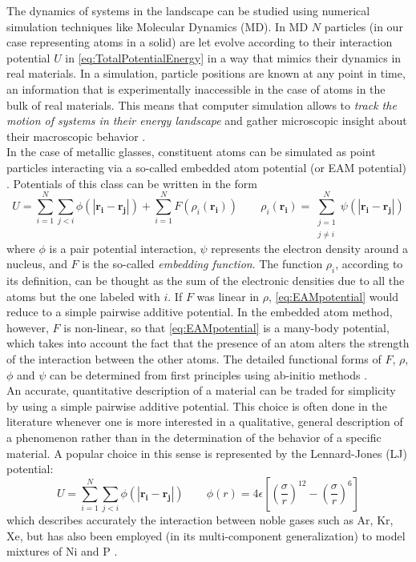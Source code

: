 The dynamics of systems in the landscape can be studied using numerical simulation techniques like Molecular Dynamics (MD). In MD $N$ particles (in our case representing atoms in a solid) are let evolve according to their interaction potential $U$ in \autoref{eq:TotalPotentialEnergy} in a way that mimics their dynamics in real materials. In a simulation, particle positions are known at any point in time, an information that is experimentally inaccessible in the case of atoms in the bulk of real materials. This means that computer simulation allows to \emph{track the motion of systems in their energy landscape} and gather microscopic insight about their macroscopic behavior \cite{heuer2008exploring}.\\
In the case of metallic glasses, constituent atoms can be simulated as point particles interacting via a so-called embedded atom potential (or EAM potential) \cite{daw1993embedded}. Potentials of this class can be written in the form
\begin{equation}
U = \sum_{i=1}^{N} \sum_{j<i} \phi(|\mathbf{r_{i} - r_{j}}|) + \sum_{i = 1}^{N} F(\rho_{i}(\mathbf{r_{i}})) \qquad \rho_{i}(\mathbf{r_{i}}) = \sum_{\substack{j = 1\\ j \neq i}}^{N} \psi (|\mathbf{r_{i} - r_{j}}|)
\label{eq:EAMpotential}
\end{equation}
where $\phi$ is a pair potential interaction, $\psi$ represents the electron density around a nucleus, and $F$ is the so-called \emph{embedding function}. The function $\rho_{i}$, according to its definition, can be thought as the sum of the electronic densities due to all the atoms but the one labeled with $i$. If $F$ was linear in $\rho$, \autoref{eq:EAMpotential} would reduce to a simple pairwise additive potential. In the embedded atom method, however, $F$ is non-linear, so that \autoref{eq:EAMpotential} is a many-body potential, which takes into account the fact that the presence of an atom alters the strength of the interaction between the other atoms. The detailed functional forms of $F$, $\rho$, $\phi$ and $\psi$ can be determined from first principles using ab-initio methods \cite{daw1993embedded}.\\
An accurate, quantitative description of a material can be traded for simplicity by using a simple pairwise additive potential. This choice is often done in the literature whenever one is more interested in a qualitative, general description of a phenomenon rather than in the determination of the behavior of a specific material. A popular choice in this sense is represented by the Lennard-Jones (LJ) potential:
\begin{equation}
U = \sum_{i=1}^{N} \sum_{j<i} \phi(|\mathbf{r_{i} - r_{j}}|) \qquad \phi(r) = 4\epsilon \left[\left(\frac{\sigma}{r}\right)^{12} - \left(\frac{\sigma}{r}\right)^{6}\right]
\label{eq:LennardJonesPotential}
\end{equation}
which describes accurately the interaction between noble gases such as Ar, Kr, Xe, but has also been employed (in its multi-component generalization) to model mixtures of Ni and P \cite{kob1995testing}. 

